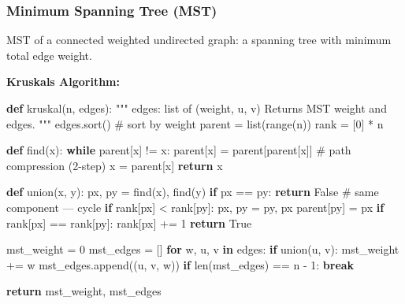 \documentclass[11pt]{article}
\newenvironment{Shaded}{\begin{snugshade}}{\end{snugshade}}
\newcommand{\BuiltInTok}[1]{\textcolor[rgb]{0.50,0.55,0.55}{#1}}
\newcommand{\CommentTok}[1]{\textcolor[rgb]{0.48,0.49,0.49}{#1}}
\newcommand{\ControlFlowTok}[1]{\textcolor[rgb]{0.99,0.74,0.29}{\textbf{#1}}}
\newcommand{\DecValTok}[1]{\textcolor[rgb]{0.96,0.45,0.00}{#1}}
\newcommand{\KeywordTok}[1]{\textcolor[rgb]{0.81,0.81,0.76}{\textbf{#1}}}
\newcommand{\NormalTok}[1]{\textcolor[rgb]{0.81,0.81,0.76}{#1}}
\newcommand{\OperatorTok}[1]{\textcolor[rgb]{0.81,0.81,0.76}{#1}}
\newcommand{\VariableTok}[1]{\textcolor[rgb]{0.15,0.68,0.68}{#1}}
\begin{document}
\subsubsection{Minimum Spanning Tree (MST)}\label{minimum-spanning-tree-mst}

MST of a connected weighted undirected graph: a spanning tree with minimum total edge weight.

\textbf{Kruskal\textquotesingle s Algorithm:}


\begin{Shaded}
\begin{Highlighting}[]
\KeywordTok{def}\NormalTok{ kruskal(n, edges):}
    \CommentTok{"""}
\CommentTok{    edges: list of (weight, u, v)}
\CommentTok{    Returns MST weight and edges.}
\CommentTok{    """}
\NormalTok{    edges.sort()   }\CommentTok{\# sort by weight}
\NormalTok{    parent }\OperatorTok{=} \BuiltInTok{list}\NormalTok{(}\BuiltInTok{range}\NormalTok{(n))}
\NormalTok{    rank }\OperatorTok{=}\NormalTok{ [}\DecValTok{0}\NormalTok{] }\OperatorTok{*}\NormalTok{ n}

    \KeywordTok{def}\NormalTok{ find(x):}
        \ControlFlowTok{while}\NormalTok{ parent[x] }\OperatorTok{!=}\NormalTok{ x:}
\NormalTok{            parent[x] }\OperatorTok{=}\NormalTok{ parent[parent[x]]  }\CommentTok{\# path compression (2{-}step)}
\NormalTok{            x }\OperatorTok{=}\NormalTok{ parent[x]}
        \ControlFlowTok{return}\NormalTok{ x}

    \KeywordTok{def}\NormalTok{ union(x, y):}
\NormalTok{        px, py }\OperatorTok{=}\NormalTok{ find(x), find(y)}
        \ControlFlowTok{if}\NormalTok{ px }\OperatorTok{==}\NormalTok{ py: }\ControlFlowTok{return} \VariableTok{False}   \CommentTok{\# same component — cycle}
        \ControlFlowTok{if}\NormalTok{ rank[px] }\OperatorTok{\textless{}}\NormalTok{ rank[py]:}
\NormalTok{            px, py }\OperatorTok{=}\NormalTok{ py, px}
\NormalTok{        parent[py] }\OperatorTok{=}\NormalTok{ px}
        \ControlFlowTok{if}\NormalTok{ rank[px] }\OperatorTok{==}\NormalTok{ rank[py]:}
\NormalTok{            rank[px] }\OperatorTok{+=} \DecValTok{1}
        \ControlFlowTok{return} \VariableTok{True}

\NormalTok{    mst\_weight }\OperatorTok{=} \DecValTok{0}
\NormalTok{    mst\_edges }\OperatorTok{=}\NormalTok{ []}
    \ControlFlowTok{for}\NormalTok{ w, u, v }\KeywordTok{in}\NormalTok{ edges:}
        \ControlFlowTok{if}\NormalTok{ union(u, v):}
\NormalTok{            mst\_weight }\OperatorTok{+=}\NormalTok{ w}
\NormalTok{            mst\_edges.append((u, v, w))}
            \ControlFlowTok{if} \BuiltInTok{len}\NormalTok{(mst\_edges) }\OperatorTok{==}\NormalTok{ n }\OperatorTok{{-}} \DecValTok{1}\NormalTok{:}
                \ControlFlowTok{break}

    \ControlFlowTok{return}\NormalTok{ mst\_weight, mst\_edges}
\end{Highlighting}
\end{Shaded}
\end{document}
